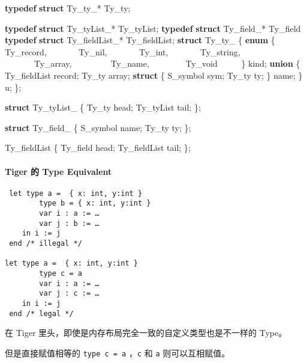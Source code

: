 \documentclass[
]{article}
\newenvironment{Shaded}{}{}
\newcommand{\KeywordTok}[1]{\textcolor[rgb]{0.00,0.44,0.13}{\textbf{#1}}}
\newcommand{\NormalTok}[1]{#1}
\begin{document}
\begin{Shaded}
\begin{Highlighting}[]
\KeywordTok{typedef} \KeywordTok{struct}\NormalTok{ Ty_ty_*     Ty_ty;}

\KeywordTok{typedef} \KeywordTok{struct}\NormalTok{ Ty_tyList_* Ty_tyList;}
\KeywordTok{typedef} \KeywordTok{struct}\NormalTok{ Ty_field_* Ty_field }\KeywordTok{typedef} \KeywordTok{struct}\NormalTok{ Ty_fieldList_* Ty_fieldList;}
\KeywordTok{struct}\NormalTok{ Ty_ty_ \{}
    \KeywordTok{enum}\NormalTok{ \{ Ty_record, }
\NormalTok{           Ty_nil, }
\NormalTok{           Ty_int, }
\NormalTok{           Ty_string, }
\NormalTok{           Ty_array, }
\NormalTok{           Ty_name, }
\NormalTok{           Ty_void }
\NormalTok{         \} kind;}
    \KeywordTok{union}\NormalTok{ \{}
\NormalTok{        Ty_fieldList record;}
\NormalTok{        Ty_ty        array;}
        \KeywordTok{struct}\NormalTok{ \{}
\NormalTok{            S_symbol sym;}
\NormalTok{            Ty_ty    ty;}
\NormalTok{        \} name;}
\NormalTok{    \} u;}
\NormalTok{\};}

\KeywordTok{struct}\NormalTok{ Ty_tyList_ \{}
\NormalTok{    Ty_ty     head;}
\NormalTok{    Ty_tyList tail;}
\NormalTok{\};}

\KeywordTok{struct}\NormalTok{ Ty_field_ \{}
\NormalTok{    S_symbol name;}
\NormalTok{    Ty_ty    ty;}
\NormalTok{\};}

\NormalTok{Ty_fieldList \{}
\NormalTok{    Ty_field     head;}
\NormalTok{    Ty_fieldList tail;}
\NormalTok{\};}
\end{Highlighting}
\end{Shaded}

\hypertarget{header-n100}{%
\paragraph{Tiger 的 Type Equivalent}\label{header-n100}}

\begin{verbatim}
 let type a =  { x: int, y:int }
        type b = { x: int, y:int }
        var i : a := …
        var j : b := …
    in i := j
 end /* illegal */

let type a =  { x: int, y:int }
        type c = a
        var i : a := …
        var j : c := …
    in i := j
 end /* legal */
\end{verbatim}

在 Tiger 里头，即使是内存布局完全一致的自定义类型也是不一样的 Type。

但是直接赋值相等的 \texttt{type\ c\ =\ a} ，\texttt{c} 和 \texttt{a}
则可以互相赋值。
\end{document}
